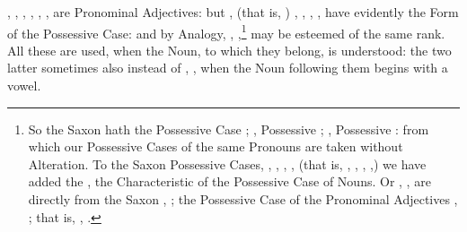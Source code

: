 , , , , , , are
Pronominal Adjectives: but , (that is, ) ,
, , , have evidently the Form of the
Possessive Case: and by Analogy, , ,\footnote{So the
  Saxon  hath the Possessive Case ; , Possessive
  ; , Possessive : from which our Possessive
  Cases of the same Pronouns are taken without Alteration. To the Saxon
  Possessive Cases, , , , , (that
  is, , , , ,) we have added
  the , the Characteristic of the Possessive Case of Nouns. Or
  , , are directly from the Saxon ,
  ; the Possessive Case of the Pronominal Adjectives
  , ; that is, , .} may be esteemed
of the same rank. All these are used, when the Noun, to which they
belong, is understood: the two latter sometimes also instead of ,
, when the Noun following them begins with a vowel.

